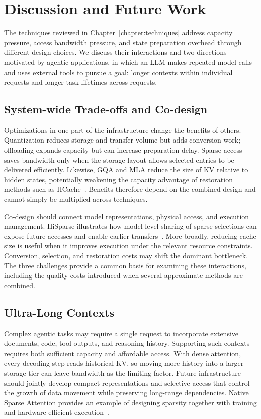 \chapter{Discussion and Future Work}\label{chapter:discussion}

The techniques reviewed in Chapter~\ref{chapter:techniques} address capacity pressure, access bandwidth pressure, and state preparation overhead through different design choices. We discuss their interactions and two directions motivated by agentic applications, in which an LLM makes repeated model calls and uses external tools to pursue a goal: longer contexts within individual requests and longer task lifetimes across requests.

\section{System-wide Trade-offs and Co-design}\label{sec:discussion:codesign}

Optimizations in one part of the infrastructure change the benefits of others. Quantization reduces storage and transfer volume but adds conversion work; offloading expands capacity but can increase preparation delay. Sparse access saves bandwidth only when the storage layout allows selected entries to be delivered efficiently. Likewise, GQA and MLA reduce the size of KV relative to hidden states, potentially weakening the capacity advantage of restoration methods such as HCache~\cite{kv_gao2025hcache}. Benefits therefore depend on the combined design and cannot simply be multiplied across techniques.

Co-design should connect model representations, physical access, and execution management. HiSparse illustrates how model-level sharing of sparse selections can expose future accesses and enable earlier transfers~\cite{kv_xie2026hisparse}. More broadly, reducing cache size is useful when it improves execution under the relevant resource constraints. Conversion, selection, and restoration costs may shift the dominant bottleneck. The three challenges provide a common basis for examining these interactions, including the quality costs introduced when several approximate methods are combined.

\section{Ultra-Long Contexts}\label{sec:discussion:long-context}

Complex agentic tasks may require a single request to incorporate extensive documents, code, tool outputs, and reasoning history. Supporting such contexts requires both sufficient capacity and affordable access. With dense attention, every decoding step reads historical KV, so moving more history into a larger storage tier can leave bandwidth as the limiting factor. Future infrastructure should jointly develop compact representations and selective access that control the growth of data movement while preserving long-range dependencies. Native Sparse Attention provides an example of designing sparsity together with training and hardware-efficient execution~\cite{kv_yuan2025nsa}.

